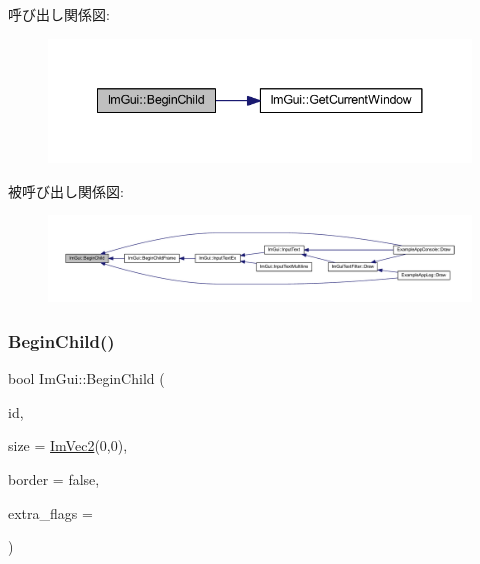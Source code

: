 呼び出し関係図\+:\nopagebreak
\begin{figure}[H]
\begin{center}
\leavevmode
\includegraphics[width=341pt]{namespace_im_gui_a93b10a516e6da427b743906ad97d7f16_cgraph}
\end{center}
\end{figure}
被呼び出し関係図\+:\nopagebreak
\begin{figure}[H]
\begin{center}
\leavevmode
\includegraphics[width=350pt]{namespace_im_gui_a93b10a516e6da427b743906ad97d7f16_icgraph}
\end{center}
\end{figure}
\mbox{\label{namespace_im_gui_a3320a3f36d9d8b227f93a015792379d3}} 
\subsubsection{\texorpdfstring{Begin\+Child()}{BeginChild()}\hspace{0.1cm}{\footnotesize\ttfamily [2/2]}}
{\footnotesize\ttfamily bool Im\+Gui\+::\+Begin\+Child (\begin{DoxyParamCaption}\item[{\mbox{\hyperlink{imgui_8h_a1785c9b6f4e16406764a85f32582236f}{Im\+Gui\+ID}}}]{id,  }\item[{const \mbox{\hyperlink{struct_im_vec2}{Im\+Vec2}} \&}]{size = {\ttfamily \mbox{\hyperlink{struct_im_vec2}{Im\+Vec2}}(0,0)},  }\item[{bool}]{border = {\ttfamily false},  }\item[{\mbox{\hyperlink{imgui_8h_a0b8e067ab4f7a818828c8d89e531addc}{Im\+Gui\+Window\+Flags}}}]{extra\+\_\+flags = {} }\end{DoxyParamCaption})}



